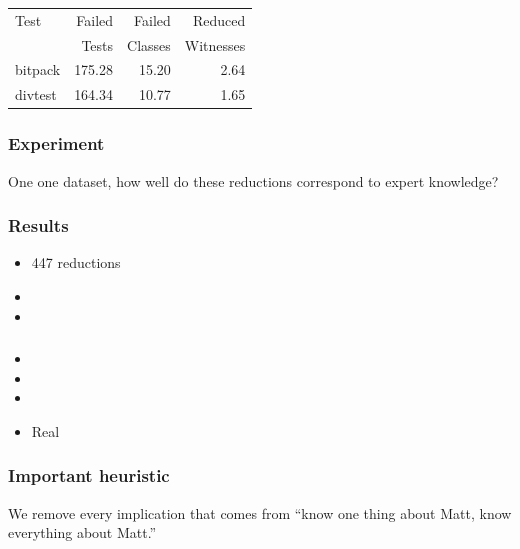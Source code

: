 \documentclass[svgnames,14pt]{beamer}
\theoremstyle{definition}
\begin{document}
\begin{frame}
\fontsize{8.3}{6.5}\selectfont

\end{frame}

\begin{frame}
\def\?{\phantom0}
\begin{center} 
\begin{tabular}{ | l | r | r | r |}
\hline
Test & Failed & Failed  & Reduced \\
     & Tests  & Classes & Witnesses \\
\hline
bitpack & 175.28 & 15.20 & 2.64\\
divtest & 164.34 & 10.77 & 1.65\\
\hline
\end{tabular}
\end{center}
\end{frame}

\begin{frame}
\frametitle{Experiment}
One one dataset, how well do these reductions correspond to expert knowledge?
\end{frame}

\begin{frame}
\frametitle{Results}
\begin{itemize}
\item 447 reductions
\item {}
\item {}
\end{itemize}
\end{frame}

\begin{frame}
\frametitle{}
\begin{itemize}
\item {}
\item {}
\item {}
\item {Real}
\end{itemize}
\end{frame}

\begin{frame}
\frametitle{Important heuristic}
We remove every implication that comes from ``know one thing about Matt, know everything about Matt.''
\end{frame}
\end{document}
